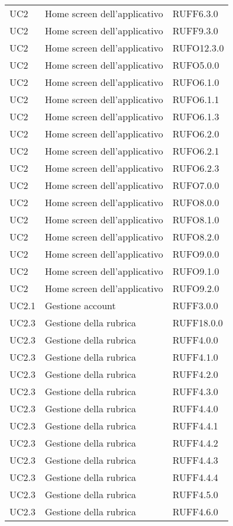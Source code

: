 \begin{longtable}{lp{}l}
UC2 & Home screen dell'applicativo & RUFF6.3.0 \\
UC2 & Home screen dell'applicativo & RUFF9.3.0 \\
UC2 & Home screen dell'applicativo & RUFO12.3.0 \\
UC2 & Home screen dell'applicativo & RUFO5.0.0 \\
UC2 & Home screen dell'applicativo & RUFO6.1.0 \\
UC2 & Home screen dell'applicativo & RUFO6.1.1 \\
UC2 & Home screen dell'applicativo & RUFO6.1.3 \\
UC2 & Home screen dell'applicativo & RUFO6.2.0 \\
UC2 & Home screen dell'applicativo & RUFO6.2.1 \\
UC2 & Home screen dell'applicativo & RUFO6.2.3 \\
UC2 & Home screen dell'applicativo & RUFO7.0.0 \\
UC2 & Home screen dell'applicativo & RUFO8.0.0 \\
UC2 & Home screen dell'applicativo & RUFO8.1.0 \\
UC2 & Home screen dell'applicativo & RUFO8.2.0 \\
UC2 & Home screen dell'applicativo & RUFO9.0.0 \\
UC2 & Home screen dell'applicativo & RUFO9.1.0 \\
UC2 & Home screen dell'applicativo & RUFO9.2.0 \\
UC2.1 & Gestione account & RUFF3.0.0 \\
UC2.3 & Gestione della rubrica & RUFF18.0.0 \\
UC2.3 & Gestione della rubrica & RUFF4.0.0 \\
UC2.3 & Gestione della rubrica & RUFF4.1.0 \\
UC2.3 & Gestione della rubrica & RUFF4.2.0 \\
UC2.3 & Gestione della rubrica & RUFF4.3.0 \\
UC2.3 & Gestione della rubrica & RUFF4.4.0 \\
UC2.3 & Gestione della rubrica & RUFF4.4.1 \\
UC2.3 & Gestione della rubrica & RUFF4.4.2 \\
UC2.3 & Gestione della rubrica & RUFF4.4.3 \\
UC2.3 & Gestione della rubrica & RUFF4.4.4 \\
UC2.3 & Gestione della rubrica & RUFF4.5.0 \\
UC2.3 & Gestione della rubrica & RUFF4.6.0 \\

\end{longtable}
